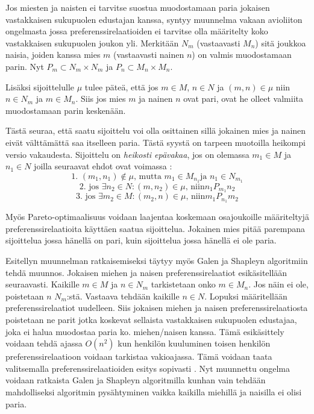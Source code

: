 \documentclass[gradu, twoside]{tktltiki}
\begin{document}
Jos miesten ja naisten ei tarvitse suostua muodostamaan paria jokaisen
vastakkaisen sukupuolen edustajan kanssa, syntyy muunnelma vakaan
avioliiton ongelmasta jossa preferenssirelaatioiden ei tarvitse olla
määritelty koko vastakkaisen sukupuolen joukon yli. Merkitään $N_m$
(vastaavasti $M_n$) sitä joukkoa naisia, joiden kanssa mies $m$
(vastaavasti nainen $n$) on valmis muodostamaan parin. Nyt $P_m
\subset N_m \times N_m$ ja $P_n \subset M_n \times M_n$.

 Lisäksi sijoittelulle $\mu$ tulee päteä, että jos $m \in M$, $n \in
 N$ ja $(m, n) \in \mu$ niin $n \in N_m$ ja $m \in M_n$. Siis jos mies
 $m$ ja nainen $n$ ovat pari, ovat he olleet valmiita muodostamaan
 parin keskenään.

Tästä seuraa, että saatu sijoittelu voi olla osittainen sillä jokainen
mies ja nainen eivät välttämättä saa itselleen paria. Tästä syystä on
tarpeen muotoilla heikompi versio vakaudesta. Sijoittelu on
\emph{heikosti epävakaa}, jos on olemassa $m_1 \in M$ ja $n_1 \in N$
joilla seuraavat ehdot ovat voimassa \cite{gusfield89}:
\[
\text{1. }(m_1, n_1) \notin \mu \text{, mutta } m_1 \in M_{n_1} \text{
  ja } n_1 \in N_{m_1}
\]
\[
\text{2. jos }\exists n_2 \in N: (m, n_2) \in \mu \text{, niin
}n_1P_{m_1}n_2
\]
\[
\text{3. jos }\exists m_2 \in M: (m_2, n) \in \mu \text{, niin
}m_1P_{n_1}m_2
\]

Myös Pareto-optimaalisuus voidaan laajentaa koskemaan osajoukoille
määriteltyjä preferenssirelaatioita käyttäen saatua sijoittelua.
Jokainen mies pitää parempana sijoittelua jossa hänellä on pari, kuin
sijoittelua jossa hänellä ei ole paria. \cite{gusfield89}

Esitellyn muunnelman ratkaisemiseksi täytyy myös Galen ja Shapleyn
algoritmiin tehdä muunnos. Jokaisen miehen ja naisen
preferenssirelaatiot esikäsitellään seuraavasti. Kaikille $m \in M$ ja
$n \in N_m$ tarkistetaan onko $m \in M_{n}$. Jos näin ei ole,
poistetaan $n$ $N_m$:stä. \cite{gusfield89} Vastaava tehdään kaikille
$n \in N$. Lopuksi määritellään preferenssirelaatiot uudelleen. Siis
jokaisen miehen ja naisen preferenssirelaatiosta poistetaan ne parit
jotka koskevat sellaista vastakkaisen sukupuolen edustajaa, joka ei
halua muodostaa paria ko. miehen/naisen kanssa. Tämä esikäsittely
voidaan tehdä ajassa $O(n^2)$ kun henkilön kuuluminen toisen henkilön
preferenssirelaatioon voidaan tarkistaa vakioajassa. Tämä voidaan
taata valitsemalla preferenssirelaatioiden esitys sopivasti
\cite{gusfield89}. Nyt muunnettu ongelma voidaan ratkaista Galen ja
Shapleyn algoritmilla kunhan vain tehdään mahdolliseksi algoritmin
pysähtyminen vaikka kaikilla miehillä ja naisilla ei olisi paria.
\end{document}
